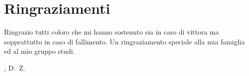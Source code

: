 
\cleardoublepage
{}
{}



\bigskip

\begingroup
\let\clearpage\relax
\let\cleardoublepage\relax
\let\cleardoublepage\relax

\chapter*{Ringraziamenti}


Ringrazio tutti coloro che mi hanno sostenuto sia in caso di vittora ma sopprattutto in caso di fallimento.
Un ringraziamento speciale alla mia famiglia ed al mio gruppo studi.

\bigskip
 
\noindent\textit{\myLocation, \myTime}
\hfill D.~Z.

\endgroup

